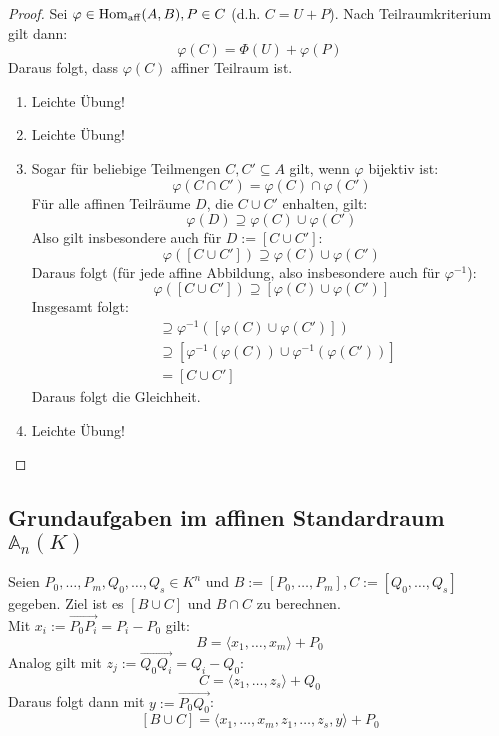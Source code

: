 \documentclass[parskip,a4paper,twoside,DIV15,BCOR12mm]{scrbook}
\begin{document}
\begin{proof}
Sei $\varphi\in\operatorname{Hom_{aff}}(A,B), P\in C$ (d.h. $C=U+P$). Nach Teilraumkriterium gilt dann:
\[\varphi(C)=\Phi(U)+\varphi(P)\]
Daraus folgt, dass $\varphi(C)$ affiner Teilraum ist.
\begin{enumerate}
\item Leichte Übung!
\item Leichte Übung!
\item Sogar für beliebige Teilmengen $C,C'\subseteq A$ gilt, wenn $\varphi$ bijektiv ist:
\[\varphi(C\cap C')=\varphi(C)\cap\varphi(C')\]
Für alle affinen Teilräume $D$, die $C\cup C'$ enhalten, gilt:
\[\varphi(D)\supseteq\varphi(C)\cup\varphi(C')\]
Also gilt insbesondere auch für $D:=[C\cup C']$:
\[\varphi([C\cup C'])\supseteq\varphi(C)\cup\varphi(C')\]
Daraus folgt (für jede affine Abbildung, also insbesondere auch für $\varphi^{-1}$):
\[\varphi([C\cup C'])\supseteq[\varphi(C)\cup\varphi(C')]\]
Insgesamt folgt:
\begin{align*}
[C\cup C']&\supseteq\varphi^{-1}([\varphi(C)\cup\varphi(C')])\\
&\supseteq[\varphi^{-1}(\varphi(C))\cup\varphi^{-1}(\varphi(C'))]\\
&= [C\cup C']
\end{align*}
Daraus folgt die Gleichheit.
\item Leichte Übung!
\end{enumerate}
\end{proof}

\subsection{Grundaufgaben im affinen Standardraum $\mathbb{A}_n(K)$}
Seien $P_0,\ldots,P_m,Q_0,\ldots,Q_s\in K^n$ und $B:=[P_0,\ldots,P_m], C:=[Q_0,\ldots,Q_s]$
gegeben. Ziel ist es $[B\cup C]$ und $B\cap C$ zu berechnen.\\

Mit $x_i:=\overrightarrow{P_0P_i}=P_i-P_0$ gilt:
\[B=\langle x_1,\ldots,x_m\rangle+P_0\]
Analog gilt mit $z_j:=\overrightarrow{Q_0Q_i}=Q_i-Q_0$:
\[C=\langle z_1,\ldots,z_s\rangle+Q_0\]
Daraus folgt dann mit $y:=\overrightarrow{P_0Q_0}$:
\[[B\cup C]=\langle x_1,\ldots,x_m,z_1,\ldots,z_s,y\rangle+P_0\]
\end{document}
